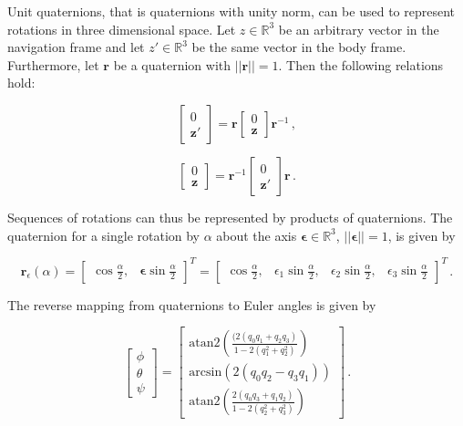Unit quaternions, that is quaternions with unity norm, can be used to represent rotations in three dimensional space. Let $z \in \mathbb{R}^3$ be an arbitrary vector in the navigation frame and let $z' \in \mathbb{R}^3$ be the same vector in the body frame. Furthermore, let $\mathbf{r}$ be a quaternion with $||\mathbf{r}|| = 1$. Then the following relations hold:

\begin{equation}
  \begin{bmatrix}
  	0 \\ \mathbf{z}' 
  \end{bmatrix} = \mathbf{r} \begin{bmatrix}
  	0 \\ \mathbf{z} 
  \end{bmatrix} \mathbf{r}^{-1}\,,
\end{equation}

\begin{equation}
  \begin{bmatrix}
  	0 \\ \mathbf{z} 
  \end{bmatrix} = \mathbf{r}^{-1} \begin{bmatrix}
  	0 \\ \mathbf{z}' 
  \end{bmatrix} \mathbf{r}\,.
\end{equation}

\noindent
Sequences of rotations can thus be represented by products of quaternions. The quaternion for a single rotation by $\alpha$ about the axis $\bm{\epsilon} \in \mathbb{R}^3$, $||\bm{\epsilon}|| = 1$, is given by

\begin{equation}
  \mathbf{r}_{\epsilon}(\alpha) = \begin{bmatrix}
  	\cos \frac{\alpha}{2}, & \bm{\epsilon} \sin \frac{\alpha}{2}
  \end{bmatrix}^T = \begin{bmatrix}
  	\cos \frac{\alpha}{2}, & \epsilon _1 \sin \frac{\alpha}{2}, & \epsilon _2 \sin \frac{\alpha}{2}, & \epsilon _3 \sin \frac{\alpha}{2}
  \end{bmatrix}^T\,.
\end{equation}

\noindent
The reverse mapping from quaternions to Euler angles is given by

\begin{equation}
  \begin{bmatrix}
\phi \\ \theta \\ \psi
\end{bmatrix} =
\begin{bmatrix}
\mbox{atan2} (\frac{(2(q_0 q_1 + q_2 q_3)}{1 - 2(q_1^2 + q_2^2)}) \\
\mbox{arcsin} (2(q_0 q_2 - q_3 q_1)) \\
\mbox{atan2} (\frac{2(q_0 q_3 + q_1 q_2)}{1 - 2(q_2^2 + q_3^2)})
\end{bmatrix}\,.
\end{equation}

